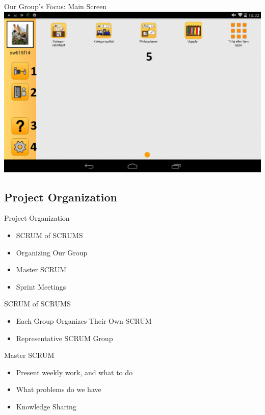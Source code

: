 \begin{frame}{Our Group's Focus: Main Screen}
\includegraphics[scale=0.28]{figures/MenuGuardian.png} 
\end{frame}

\subsection{Project Organization}
\begin{frame}{Project Organization}
\begin{itemize} 
	\item SCRUM of SCRUMS
	\item Organizing Our Group
	\item Master SCRUM
	\item Sprint Meetings
\end{itemize}
\end{frame}

\begin{frame}{SCRUM of SCRUMS}
\begin{itemize} 
	\item Each Group Organizes Their Own SCRUM
	\item Representative SCRUM Group
\end{itemize}
\end{frame}

\begin{frame}{Master SCRUM}
\begin{itemize} 
	\item Present weekly work, and what to do
    \item What problems do we have
    \item Knowledge Sharing
\end{itemize}
\end{frame}

